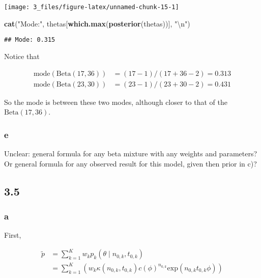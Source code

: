 \documentclass[]{article}
\newenvironment{Shaded}{\begin{snugshade}}{\end{snugshade}}
\newcommand{\CharTok}[1]{\textcolor[rgb]{0.31,0.60,0.02}{#1}}
\newcommand{\KeywordTok}[1]{\textcolor[rgb]{0.13,0.29,0.53}{\textbf{#1}}}
\newcommand{\NormalTok}[1]{#1}
\newcommand{\StringTok}[1]{\textcolor[rgb]{0.31,0.60,0.02}{#1}}
\begin{document}
\begin{center}\texttt{[image: 3\_files/figure-latex/unnamed-chunk-15-1]} \end{center}

\begin{Shaded}
\begin{Highlighting}[]
\KeywordTok{cat}\NormalTok{(}\StringTok{"Mode:"}\NormalTok{, thetas[}\KeywordTok{which.max}\NormalTok{(}\KeywordTok{posterior}\NormalTok{(thetas))], }\StringTok{"}\CharTok{\textbackslash{}n}\StringTok{"}\NormalTok{)}
\end{Highlighting}
\end{Shaded}

\begin{verbatim}
## Mode: 0.315
\end{verbatim}

Notice that

\begin{align}
\text{mode}(\text{Beta}(17, 36)) &= (17 - 1) / (17 + 36 - 2) = 0.313 \\
\text{mode}(\text{Beta}(23, 30)) &= (23 - 1) / (23 + 30 - 2) = 0.431
\end{align}

So the mode is between these two modes, although closer to that of the
\(\text{Beta}(17, 36)\).

\hypertarget{e-1}{%
\subsubsection{e}\label{e-1}}

Unclear: general formula for any beta mixture with any weights and
parameters? Or general formula for any observed result for this model,
given then prior in c)?

\hypertarget{section-4}{%
\subsection{3.5}\label{section-4}}

\hypertarget{a-3}{%
\subsubsection{a}\label{a-3}}

First,

\begin{align}
\tilde{p} &= \sum_{k = 1}^K w_k p_k (\theta \mid n_{0, k}, t_{0, k}) \\
&= \sum_{k = 1}^K \left( w_k \kappa (n_{0, k}, t_{0, k}) c(\phi)^{n_{0, k}} \text{exp}(n_{0, k} t_{0, k} \phi) \right) \\
\end{align}
\end{document}
